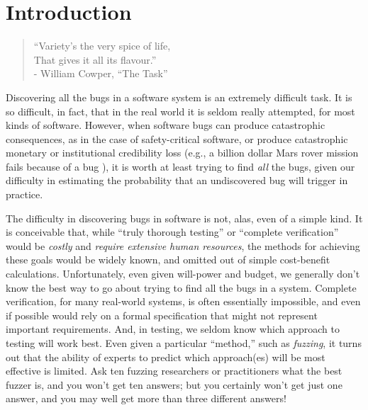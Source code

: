 \documentclass[sigplan]{acmart}
\begin{document}



\maketitle

\section{Introduction}

\begin{quote}
  ``Variety's the very spice of life,\\
  That gives it all its flavour.''
  \\ - William Cowper, ``The Task''
  \end{quote}

Discovering all the bugs in a software system is an extremely
difficult task.  It is so difficult, in fact, that in the real world
it is seldom really attempted, for most kinds of software.  However,
when software bugs can produce catastrophic consequences, as in the
case of safety-critical software, or produce catastrophic monetary or
institutional credibility
loss (e.g., a billion dollar Mars rover mission fails because of a bug
\cite{Spirit}), it is worth at least trying to find \emph{all} the bugs,
given our difficulty in estimating the probability that an
undiscovered bug will trigger in practice.

The difficulty in discovering bugs in software is not, alas, even of
a simple kind.  It is conceivable that, while ``truly thorough testing'' or
``complete verification'' would be \emph{costly} and \emph{require
  extensive human resources}, the methods for achieving these goals
would be widely known, and omitted out of simple cost-benefit
calculations.  Unfortunately, even given will-power and budget, we
generally don't know the best way to go about trying to find all the
bugs in a system.  Complete verification, for many real-world systems,
is often essentially impossible, and even if possible would rely on a
formal specification that might not represent important requirements.
And, in testing, we seldom know which approach to testing will work
best.  Even given a particular ``method,'' such as \emph{fuzzing}, it
turns out that the ability of experts to predict which approach(es)
will be most effective is limited.  Ask ten fuzzing researchers or
practitioners what the best fuzzer is, and you won't get ten answers;
but you certainly won't get just one answer, and you may well get more
than three different answers!
\end{document}
